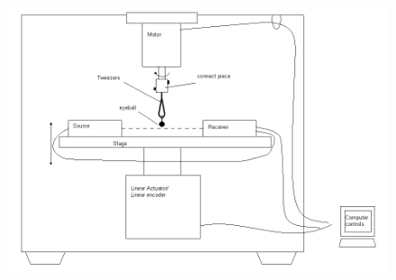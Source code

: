 \documentclass{article}
\begin{document}
\begin{figure}[h]
  \centering
  \includegraphics[width=\linewidth]{../img/schematic1}
  \label{fig:schematic1}
\end{figure}
\end{document}
